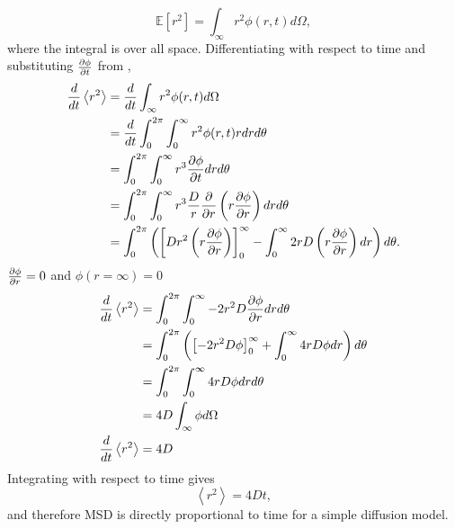 \begin{equation}
\mathbb{E}[r^2] = \int_{\infty}r^2 \phi(r,t) d\Omega ,
\label{eqn:MSD_int}
\end{equation}
%
where the integral is over all space.
%
Differentiating  with respect to time and substituting $\frac{\partial \phi}{\partial t}$ from ,
%
\begin{equation}
\begin{split}
\frac{d}{dt} \left<r^2\right> &= \frac{d}{dt}\int_{\infty}r^2 \phi(r,t) d\Omega \\
                            &= \frac{d}{dt} \int_0^{2\pi}\int_0^{\infty} r^2 \phi(r,t) r dr d\theta \\
                           &= \int_0^{2\pi} \int_0^{\infty} r^3 \frac{\partial \phi}{\partial t} dr d\theta \\
                            &= \int_0^{2\pi} \int_0^{\infty} r^3 \frac{D}{r} \frac{\partial }{\partial r } \left( r \frac{\partial  \phi}{\partial  r}\right) dr d\theta \\
                            &= \int_0^{2\pi} \left( \left[ D r^2 \left( r \frac{\partial  \phi}{\partial  r}\right) \right]_0^{\infty} - \int_0^{\infty} 2rD \left(r \frac{\partial \phi}{\partial r} \right) dr \right) d\theta. \\
\label{eqn:diffusion_1}
\end{split}
\end{equation}
%
$\frac{\partial \phi}{\partial r} = 0$ and $\phi(r=\infty)=0$
%
\begin{equation}
\begin{split}
\frac{d}{dt} \left<r^2\right> &= \int_0^{2\pi} \int_0^{\infty} -2r^2D \frac{\partial  \phi}{\partial r}dr d\theta \\
                            &= \int_0^{2\pi} \left( \left[-2r^2D \phi \right]_0^{\infty} + \int_0^{\infty} 4rD \phi dr \right)d\theta \\
                            &= \int_0^{2\pi} \int_0^{\infty} 4rD\phi dr d\theta \\
                            &= 4D \int_{\infty} \phi d\Omega \\
\frac{d}{dt} \left<r^2\right>  &= 4D \\
\label{eqn:diffusion_1}
\end{split}
\end{equation}
Integrating with respect to time gives
%
\begin{equation}
\left<r^2\right> = 4Dt ,
\label{eqn:D_msd}
\end{equation}
%
and therefore MSD is directly proportional to time for a simple diffusion model.



